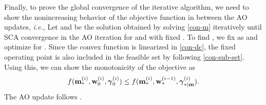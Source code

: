 Finally, to prove the global convergence of the iterative algorithm, we need to show the nonincreasing behavior of the objective function in between the \ac{AO} updates, \textit{i.e.}, 
\iftoggle{single_column}{
\begin{equation}
f(\iter{\mx}{\ast}{i},\iter{\my}{0}{i},\iter{\mz}{0}{i}) \leq f(\iter{\mx}{\ast}{i},\iter{\my}{\ast}{i-1},\iter{\mz}{\ast|\my}{i}).
\end{equation}}{
\begin{equation}
f(\iter{\mx}{\ast}{i},\iter{\my}{0}{i},\iter{\mz}{0}{i}) \leq f(\iter{\mx}{\ast}{i},\iter{\my}{\ast}{i-1},\iter{\mz}{\ast|\my}{i}).
\end{equation}}
Let  and  be the solution obtained by solving \eqref{con-m} iteratively until \ac{SCA} convergence in the  \ac{AO} iteration for \eqn{\mx} and \eqn{\mz} with fixed . To find , we fix \eqn{\mx} as  and optimize for \me{\my}. Since the convex function is linearized in \eqref{con-dc}, the fixed operating point is also included in the feasible set  by following \eqref{con-sub-set}. Using this, we can show the monotonicity of the objective as
\begin{equation} \label{fixed_point}
f(\iter{\mx}{\ast}{i},\iter{\my}{0}{i},\iter{\mz}{0}{i}) \leq f(\iter{\mx}{\ast}{i},\iter{\my}{\ast}{i-1},\iter{\mz}{\ast|\mx}{i}).
\end{equation}
The \ac{AO} update follows .

